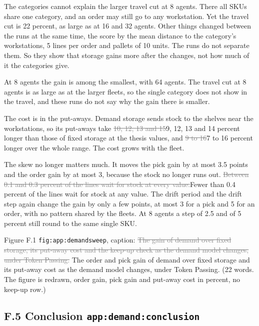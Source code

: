 \documentclass[11pt,a4paper]{article}
\newcommand{\new}[1]{\textcolor{newc}{#1}}
\newcommand{\old}[1]{\textcolor{gray}{\sout{#1}}}
\newenvironment{greenblock}{\color{newc}}{}
\newcommand{\lref}[1]{{\small\texttt{#1}}}
\begin{document}
\begin{greenblock}
The categories cannot explain the larger travel cut at 8 agents. There all
SKUs share one category, and an order may still go to any workstation. Yet
the travel cut is 22 percent, as large as at 16 and 32 agents. Other things
changed between the runs at the same time, the score by the mean distance to
the category's workstations, 5 lines per order and pallets of 10 units. The
runs do not separate them. So they show that storage gains more after the
changes, not how much of it the categories give.

At 8 agents the gain is among the smallest, with 64 agents. The travel cut at
8 agents is as large as at the larger fleets, so the single category does not
show in the travel, and these runs do not say why the gain there is smaller.
\end{greenblock}

The cost is in the put-aways. Demand storage sends stock to the shelves near
the workstations, so its put-aways take \old{10, 12, 13 and 15}\new{9, 12, 13
and 14} percent longer than those of fixed storage at the thesis values, and
\old{9 to 16}\new{7 to 16} percent longer over the whole range. The cost
grows with the fleet.

The skew no longer matters much. It moves the \new{pick} gain by at most 3.5
points\new{ and the order gain by at most 3}, because the stock no longer
runs out. \old{Between 0.1 and 0.3 percent of the lines wait for stock at
every value.}\new{Fewer than 0.4 percent of the lines wait for stock at any
value.} The drift period and the drift step again change the gain by only a
few points\new{, at most 3 for a pick and 5 for an order, with no pattern
shared by the fleets}. At 8 agents a step of 2.5 and of 5 percent still round
to the same single SKU.

Figure F.1 \lref{fig:app:demandsweep}, caption: \old{The gain of demand over
fixed storage, its put-away cost and the keep-up check as the demand model
changes, under Token Passing.}
\new{The order and pick gain of demand over fixed storage and its put-away
cost as the demand model changes, under Token Passing.} (22 words. The
figure is redrawn, order gain, pick gain and put-away cost in percent, no
keep-up row.)

\subsection*{F.5 Conclusion \hfill\lref{app:demand:conclusion}}
\end{document}
